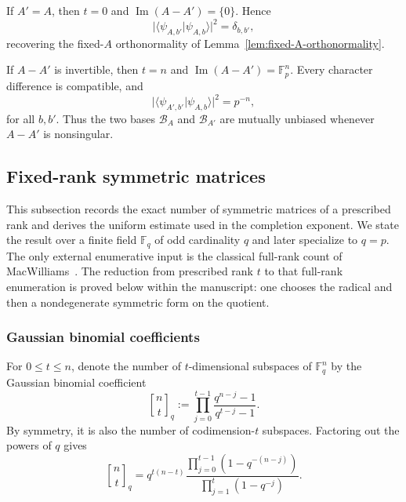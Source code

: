 \documentclass[11pt]{article}
\newcommand{\F}{\mathbb F}
\newcommand{\im}{\operatorname{Im}}
\newcommand{\1}{\mathbf 1}
\theoremstyle{plain}
\theoremstyle{definition}
\theoremstyle{remark}
\begin{document}
If $A'=A$, then $t=0$ and $\im(A-A')=\{0\}$.  Hence
\begin{equation}
  \lvert\langle\psi_{A,b'}|\psi_{A,b}\rangle\rvert^2
  =\delta_{b,b'},
  \label{eq:appB-full-label-overlap}
\end{equation}
recovering the fixed-$A$ orthonormality of
Lemma~\ref{lem:fixed-A-orthonormality}.

If $A-A'$ is invertible, then $t=n$ and
$\im(A-A')=\F_p^n$.  Every character difference is compatible, and
\begin{equation}
  \lvert\langle\psi_{A',b'}|\psi_{A,b}\rangle\rvert^2=p^{-n},
  \label{eq:appB-full-rank-mutually-unbiased}
\end{equation}
for all $b,b'$.  Thus the two bases $\mathcal B_A$ and $\mathcal B_{A'}$ are
mutually unbiased whenever $A-A'$ is nonsingular.


\subsection{Fixed-rank symmetric matrices}
\label{app:symmetric-rank-counts}

This subsection records the exact number of symmetric matrices of a
prescribed rank and derives the uniform estimate used in the completion
exponent.  We state the result over a finite field
$\F_q$ of odd cardinality $q$ and later specialize to $q=p$.  The only external enumerative input is the classical full-rank count of
MacWilliams~\cite{MacWilliams1969}.  The reduction from prescribed rank $t$ to
that full-rank enumeration is proved below within the manuscript: one chooses
the radical and then a nondegenerate symmetric form on the quotient.

\subsubsection{Gaussian binomial coefficients}
\label{appsubsec:Gaussian-binomial}

For $0\le t\le n$, denote the number of $t$-dimensional subspaces of
$\F_q^n$ by the Gaussian binomial coefficient
\begin{equation}
  \genfrac{[}{]}{0pt}{}{n}{t}_q
  :=\prod_{j=0}^{t-1}\frac{q^{n-j}-1}{q^{t-j}-1}.
  \label{eq:Gaussian-binomial-definition}
\end{equation}
By symmetry, it is also the number of codimension-$t$ subspaces.  Factoring out
the powers of $q$ gives
\begin{equation}
  \genfrac{[}{]}{0pt}{}{n}{t}_q
  =q^{t(n-t)}
   \frac{\prod_{j=0}^{t-1}(1-q^{-(n-j)})}
        {\prod_{j=1}^{t}(1-q^{-j})}.
  \label{eq:Gaussian-binomial-normalized}
\end{equation}
\end{document}
